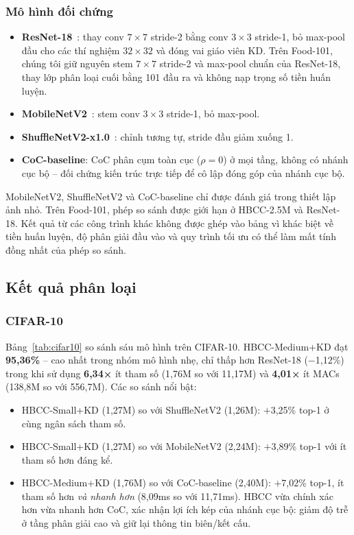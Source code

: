 \documentclass[conference]{IEEEtran}
\begin{document}
\subsubsection{Mô hình đối chứng}

\begin{itemize}
  \item \textbf{ResNet-18}~\cite{He2016ResNet}: thay conv
        $7\!\times\!7$ stride-2 bằng conv $3\!\times\!3$ stride-1,
        bỏ max-pool đầu cho các thí nghiệm $32\!\times\!32$ và đóng
        vai giáo viên KD. Trên Food-101, chúng tôi giữ nguyên stem
        $7\!\times\!7$ stride-2 và max-pool chuẩn của
        ResNet-18, thay lớp phân loại cuối bằng 101 đầu ra và không
        nạp trọng số tiền huấn luyện.
  \item \textbf{MobileNetV2}~\cite{Sandler2018MobileNetV2}: stem
        conv $3\!\times\!3$ stride-1, bỏ max-pool.
  \item \textbf{ShuffleNetV2-x1.0}~\cite{Ma2018ShuffleNetV2}:
        chỉnh tương tự, stride đầu giảm xuống 1.
  \item \textbf{CoC-baseline}: CoC phân cụm toàn cục ($\rho{=}0$)
        ở mọi tầng, không có nhánh cục bộ -- đối chứng kiến trúc
        trực tiếp để cô lập đóng góp của nhánh cục bộ.
\end{itemize}

MobileNetV2, ShuffleNetV2 và CoC-baseline chỉ được đánh giá trong
thiết lập ảnh nhỏ. Trên Food-101, phép so sánh được giới hạn ở
HBCC-2.5M và ResNet-18. Kết quả từ các công trình khác không được ghép
vào bảng vì khác biệt về tiền huấn luyện, độ phân giải đầu vào và quy
trình tối ưu có thể làm mất tính đồng nhất của phép so sánh.

\subsection{Kết quả phân loại}

\subsubsection{CIFAR-10}

Bảng~\ref{tab:cifar10} so sánh sáu mô hình trên CIFAR-10.
HBCC-Medium+KD đạt \textbf{95,36\%} -- cao nhất trong nhóm mô hình
nhẹ, chỉ thấp hơn ResNet-18 ($-$1,12\%) trong khi sử dụng
\textbf{6,34×} ít tham số (1,76M so với 11,17M) và
\textbf{4,01×} ít MACs (138,8M so với 556,7M). Các so sánh nổi bật:

\begin{itemize}
  \item HBCC-Small+KD (1,27M) so với ShuffleNetV2 (1,26M):
        $+$3,25\% top-1 ở cùng ngân sách tham số.
  \item HBCC-Small+KD (1,27M) so với MobileNetV2 (2,24M):
        $+$3,89\% top-1 với ít tham số hơn đáng kể.
  \item HBCC-Medium+KD (1,76M) so với CoC-baseline (2,40M):
        $+$7,02\% top-1, ít tham số hơn \emph{và nhanh hơn} (8,09ms
        so với 11,71ms). HBCC vừa chính xác hơn vừa nhanh hơn CoC,
        xác nhận lợi ích kép của nhánh cục bộ: giảm độ trễ ở tầng
        phân giải cao và giữ lại thông tin biên/kết cấu.
\end{itemize}
\end{document}
